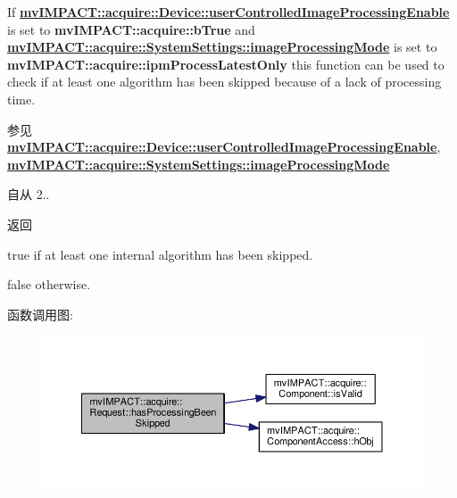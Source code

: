 If {\bfseries \hyperlink{classmv_i_m_p_a_c_t_1_1acquire_1_1_device_a4d5db996353c3b9ada5f6a15fb19f9eb}{mv\+I\+M\+P\+A\+C\+T\+::acquire\+::\+Device\+::user\+Controlled\+Image\+Processing\+Enable}} is set to {\bfseries mv\+I\+M\+P\+A\+C\+T\+::acquire\+::b\+True} and {\bfseries \hyperlink{classmv_i_m_p_a_c_t_1_1acquire_1_1_system_settings_a0e9c91668ae90fb631d5d69c32395fce}{mv\+I\+M\+P\+A\+C\+T\+::acquire\+::\+System\+Settings\+::image\+Processing\+Mode}} is set to {\bfseries mv\+I\+M\+P\+A\+C\+T\+::acquire\+::ipm\+Process\+Latest\+Only} this function can be used to check if at least one algorithm has been skipped because of a lack of processing time. \begin{DoxySeeAlso}{参见}
{\bfseries \hyperlink{classmv_i_m_p_a_c_t_1_1acquire_1_1_device_a4d5db996353c3b9ada5f6a15fb19f9eb}{mv\+I\+M\+P\+A\+C\+T\+::acquire\+::\+Device\+::user\+Controlled\+Image\+Processing\+Enable}}, ~\newline
{\bfseries \hyperlink{classmv_i_m_p_a_c_t_1_1acquire_1_1_system_settings_a0e9c91668ae90fb631d5d69c32395fce}{mv\+I\+M\+P\+A\+C\+T\+::acquire\+::\+System\+Settings\+::image\+Processing\+Mode}} ~\newline
 
\end{DoxySeeAlso}
\begin{DoxySince}{自从}
2..
\end{DoxySince}
\begin{DoxyReturn}{返回}

\begin{DoxyItemize}
\item true if at least one internal algorithm has been skipped.
\item false otherwise. 
\end{DoxyItemize}
\end{DoxyReturn}


函数调用图\+:
\nopagebreak
\begin{figure}[H]
\begin{center}
\leavevmode
\includegraphics[width=350pt]{classmv_i_m_p_a_c_t_1_1acquire_1_1_request_a523d15ab27c20de51f0c5ffd41ff3834_cgraph}
\end{center}
\end{figure}


